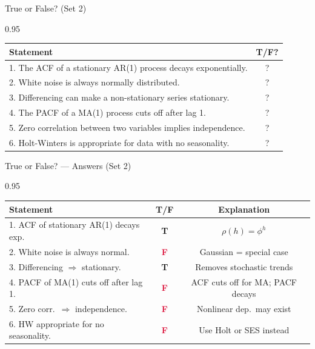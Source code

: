\documentclass[9pt, aspectratio=169, t]{beamer}
\begin{document}
\begin{frame}{True or False? (Set 2)}
    \begin{cminipage}{0.95\textwidth}
    \footnotesize
    \begin{center}
    \begin{tabular}{p{9cm}c}
        \toprule
        \textbf{Statement} & \textbf{T/F?} \\
        \midrule
        1. The ACF of a stationary AR(1) process decays exponentially. & ? \\[0.15cm]
        2. White noise is always normally distributed. & ? \\[0.15cm]
        3. Differencing can make a non-stationary series stationary. & ? \\[0.15cm]
        4. The PACF of a MA(1) process cuts off after lag 1. & ? \\[0.15cm]
        5. Zero correlation between two variables implies independence. & ? \\[0.15cm]
        6. Holt-Winters is appropriate for data with no seasonality. & ? \\
        \bottomrule
    \end{tabular}
    \end{center}
    \end{cminipage}
\end{frame}

\begin{frame}{True or False? --- Answers (Set 2)}
    \begin{cminipage}{0.95\textwidth}
    \scriptsize
    \begin{center}
    \begin{tabular}{p{7.5cm}cc}
        \toprule
        \textbf{Statement} & \textbf{T/F} & \textbf{Explanation} \\
        \midrule
        1. ACF of stationary AR(1) decays exp. & \textcolor{Forest}{\textbf{T}} & {\tiny $\rho(h) = \phi^h$} \\[0.08cm]
        2. White noise is always normal. & \textcolor{Crimson}{\textbf{F}} & {\tiny Gaussian = special case} \\[0.08cm]
        3. Differencing $\Rightarrow$ stationary. & \textcolor{Forest}{\textbf{T}} & {\tiny Removes stochastic trends} \\[0.08cm]
        4. PACF of MA(1) cuts off after lag 1. & \textcolor{Crimson}{\textbf{F}} & {\tiny ACF cuts off for MA; PACF decays} \\[0.08cm]
        5. Zero corr.\ $\Rightarrow$ independence. & \textcolor{Crimson}{\textbf{F}} & {\tiny Nonlinear dep.\ may exist} \\[0.08cm]
        6. HW appropriate for no seasonality. & \textcolor{Crimson}{\textbf{F}} & {\tiny Use Holt or SES instead} \\
        \bottomrule
    \end{tabular}
    \end{center}
    \end{cminipage}
\end{frame}
\end{document}
